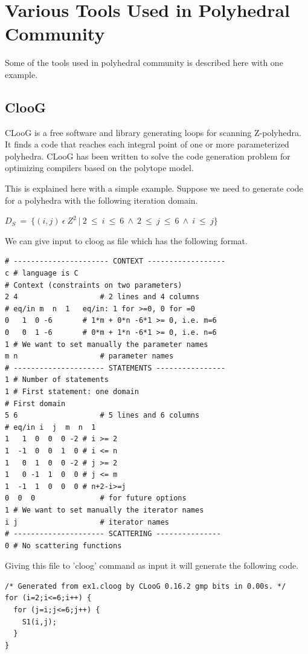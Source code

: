 \documentclass[MTech]{iitmdiss}
\begin{document}
\chapter{Various Tools Used in Polyhedral Community}
Some of the tools used in polyhedral community is described here with one example.
\section{ClooG}
CLooG is a free software and library generating loops for scanning Z-polyhedra.
It finds a code that reaches each integral point of one or more parameterized polyhedra.
CLooG has been written to solve the code generation problem for optimizing compilers based on the polytope model.

This is explained here with a simple example. Suppose we need to generate code for
a polyhedra with the following iteration domain.

\begin{center}
$D_{S}\ =\ \{(i,j)\ \epsilon\ Z^2\ |\ 2\ \leq\ i\ \leq\ 6\ \wedge\ 2\ \leq\ j\ \leq\ 6\ \wedge\ i\ \leq\ j\}$
\end{center}
We can give input to cloog as file which has the following format.
{\footnotesize
\begin{lstlisting}
# ---------------------- CONTEXT ------------------
c # language is C
# Context (constraints on two parameters)
2 4                   # 2 lines and 4 columns
# eq/in m  n  1   eq/in: 1 for >=0, 0 for =0
0   1  0 -6       # 1*m + 0*n -6*1 >= 0, i.e. m=6
0   0  1 -6       # 0*m + 1*n -6*1 >= 0, i.e. n=6
1 # We want to set manually the parameter names
m n                   # parameter names
# --------------------- STATEMENTS ----------------
1 # Number of statements
1 # First statement: one domain
# First domain
5 6                   # 5 lines and 6 columns
# eq/in i  j  m  n  1
1   1  0  0  0 -2 # i >= 2
1  -1  0  0  1  0 # i <= n
1   0  1  0  0 -2 # j >= 2
1   0 -1  1  0  0 # j <= m
1  -1  1  0  0  0 # n+2-i>=j
0  0  0               # for future options
1 # We want to set manually the iterator names
i j                   # iterator names
# --------------------- SCATTERING ---------------
0 # No scattering functions
\end{lstlisting}
}
Giving this file to 'cloog' command  as input it will generate the following code.
{\footnotesize
\begin{lstlisting}
/* Generated from ex1.cloog by CLooG 0.16.2 gmp bits in 0.00s. */
for (i=2;i<=6;i++) {
  for (j=i;j<=6;j++) {
    S1(i,j);
  }
}
\end{lstlisting}
}
\end{document}
